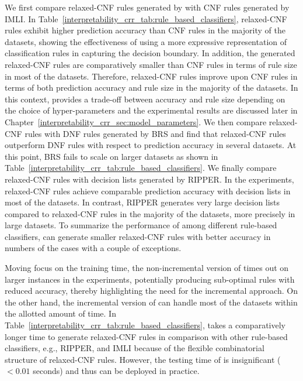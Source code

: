 We first compare relaxed-CNF rules generated by {\crr} with CNF rules generated by IMLI. In {Table}~\ref{interpretability_crr_tab:rule_based_classifiers}, relaxed-CNF rules exhibit higher prediction accuracy than CNF rules in the majority of the datasets, showing the effectiveness of using a more expressive representation of classification rules in capturing the decision boundary. In addition, the generated relaxed-CNF rules are comparatively smaller than CNF rules in terms of rule size in most of the datasets. Therefore, relaxed-CNF rules improve upon CNF rules in terms of both prediction accuracy and rule size in the majority of the datasets. In this context, {\crr} provides a trade-off between accuracy and rule size depending on the choice of hyper-parameters and the experimental results are discussed later in Chapter~\ref{interpretability_crr_sec:model_parameters}.  We then compare relaxed-CNF rules with DNF rules generated by BRS and find that relaxed-CNF rules outperform DNF rules with respect to prediction accuracy in several datasets. At this point,   BRS fails to scale on larger datasets as shown in Table~\ref{interpretability_crr_tab:rule_based_classifiers}. We finally compare relaxed-CNF rules with decision lists generated by RIPPER.  In the experiments, relaxed-CNF rules achieve comparable prediction accuracy with decision lists in most of the datasets. In contrast,   RIPPER generates very large decision lists compared to relaxed-CNF rules in the majority of the datasets, more precisely in large datasets.  To summarize the performance of {\crr} among different rule-based classifiers,  {\crr} can generate smaller relaxed-CNF rules with better accuracy in numbers of the cases with a couple of exceptions. 



Moving focus on the training time,  the non-incremental version of {\crr} times out on larger instances in the experiments, potentially producing sub-optimal rules with reduced accuracy, thereby highlighting the need for the incremental approach. On the other hand, the incremental version of {\crr} can handle most of the datasets within the allotted amount of time. In Table~\ref{interpretability_crr_tab:rule_based_classifiers}, {\crr} takes a comparatively longer time to generate relaxed-CNF rules in comparison with other rule-based classifiers, e.g., RIPPER, and IMLI because of  the flexible combinatorial structure of relaxed-CNF rules. However, the testing time of {\crr} is insignificant ($ < 0.01 $ seconds) and thus can 
 be deployed in practice.  
 

